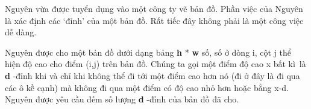 Nguyên vừa được tuyển dụng vào một công ty vẽ bản đồ. Phần việc của Nguyên là xác định các ‘đỉnh’ của một bản đồ. Rất tiếc đây không phải là một công việc dễ dàng.  

   Nguyên được cho một bản đồ dưới dạng bảng   \textbf{    h   }   *   \textbf{    w   }   số, số ở dòng i, cột j thể hiện độ cao cho điểm (i,j) trên bản đồ. Chúng ta gọi một điểm độ cao x bất kì là   \textbf{    d   }   -đỉnh khi và chỉ khi không thể đi tới một điểm cao hơn nó (đi ở đây là đi qua các ô kề cạnh) mà không đi qua một điểm có độ cao nhỏ hơn hoặc bằng x-d. Nguyên được yêu cầu đếm số lượng   \textbf{    d   }   -đỉnh của bản đồ đã cho.  

\